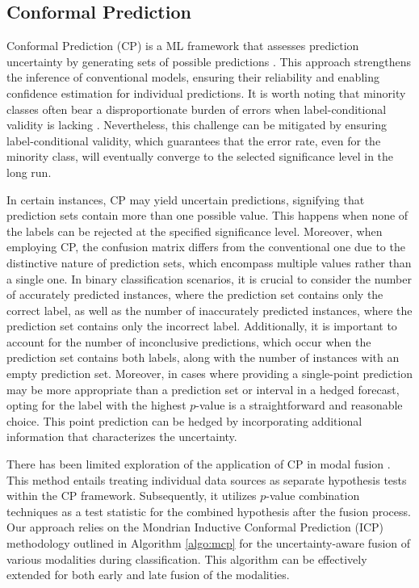\subsection*{Conformal Prediction}
\label{sec:CP}
Conformal Prediction (CP) is a ML framework that assesses prediction uncertainty by generating sets of possible predictions \cite{shafer2008tutorial}. This approach strengthens the inference of conventional models, ensuring their reliability and enabling confidence estimation for individual predictions. It is worth noting that minority classes often bear a disproportionate burden of errors when label-conditional validity is lacking \cite{lofstrom2015bias}. Nevertheless, this challenge can be mitigated by ensuring label-conditional validity, which guarantees that the error rate, even for the minority class, will eventually converge to the selected significance level in the long run. 

In certain instances, CP may yield uncertain predictions, signifying that prediction sets contain more than one possible value. This happens when none of the labels can be rejected at the specified significance level. Moreover, when employing CP, the confusion matrix differs from the conventional one due to the distinctive nature of prediction sets, which encompass multiple values rather than a single one. In binary classification scenarios, it is crucial to consider the number of accurately predicted instances, where the prediction set contains only the correct label, as well as the number of inaccurately predicted instances, where the prediction set contains only the incorrect label. Additionally, it is important to account for the number of inconclusive predictions, which occur when the prediction set contains both labels, along with the number of instances with an empty prediction set. Moreover, in cases where providing a single-point prediction may be more appropriate than a prediction set or interval in a hedged forecast, opting for the label with the highest $p$-value is a straightforward and reasonable choice. This point prediction can be hedged by incorporating additional information that characterizes the uncertainty.

There has been limited exploration of the application of CP in modal fusion \cite{balasubramanian2015conformal}. This method entails treating individual data sources as separate hypothesis tests within the CP framework. Subsequently, it utilizes $p$-value combination techniques as a test statistic for the combined hypothesis after the fusion process. Our approach relies on the Mondrian Inductive Conformal Prediction (ICP) methodology \cite{bostrom2021mondrian} outlined in Algorithm \ref{algo:mcp} for the uncertainty-aware fusion of various modalities during classification. This algorithm can be effectively extended for both early and late fusion of the modalities.

